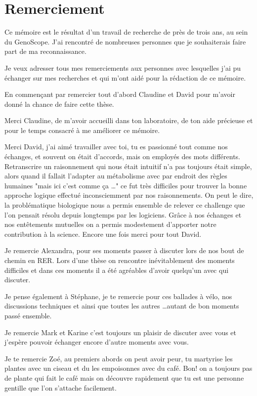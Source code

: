 \chapter*{Remerciement}
    \vspace{-4cm}
    \handwritingFont
    Ce mémoire est le résultat d’un travail de recherche de près de trois ans, au sein du GenoScope. J'ai rencontré de nombreuses personnes que je souhaiterais faire part de ma reconnaissance.
    
    Je veux adresser tous mes remerciements aux personnes avec lesquelles j’ai pu échanger sur mes recherches et qui m’ont aidé pour la rédaction de ce mémoire.
    
    En commençant par remercier tout d’abord Claudine et David pour m'avoir donné la chance de faire cette thèse.
    
    Merci Claudine, de m'avoir accueilli dans ton laboratoire, de ton aide précieuse et pour le temps consacré à me améliorer ce mémoire.
    
    Merci David, j'ai aimé travailler avec toi, tu es passionné tout comme nos échanges, et souvent on était d'accords, mais on employés des mots différents. Retranscrire un raisonnement qui nous était intuitif n'a pas toujours était simple, alors quand il fallait l'adapter au métabolisme avec par endroit des règles humaines "mais ici c'est comme ça \ldots" ce fut très difficiles pour trouver la bonne approche logique effectué inconsciemment par nos raisonnements. On peut le dire, la problématique biologique nous a permis ensemble de relever ce challenge que l'on pensait résolu depuis longtemps par les logiciens. Grâce à nos échanges et nos entêtements mutuelles on a permis modestement d'apporter notre contribution à la science.
    Encore une fois merci pour tout David.
    
    Je remercie Alexandra, pour ses moments passer à discuter lors de nos bout de chemin en RER. Lors d'une thèse on rencontre inévitablement des moments difficiles et dans ces moments il a été agréables d'avoir quelqu'un avec qui discuter.
    
    Je pense également à Stéphane, je te remercie pour ces ballades à vélo, nos discussions techniques et ainsi que toutes les autres \ldots autant de bon moments passé ensemble.
    
    Je remercie Mark et Karine c'est toujours un plaisir de discuter avec vous et j'espère pouvoir échanger encore d'autre moments avec vous.
    
    Je te remercie Zoé, au premiers abords on peut avoir peur, tu martyrise les plantes avec un ciseau et du les empoisonnes avec du café. Bon! on a toujours pas de plante qui fait le café mais on découvre rapidement que tu est une personne gentille que l'on s'attache facilement.
    
